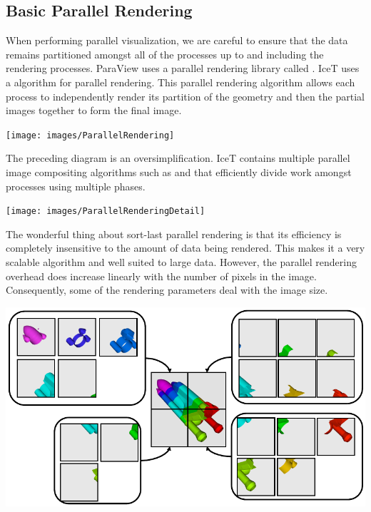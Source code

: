 \subsection{Basic Parallel Rendering}

When performing parallel visualization, we are careful to ensure that the
data remains partitioned amongst all of the processes up to and including
the rendering processes.  ParaView uses a parallel rendering library called
.  IceT uses a  algorithm for parallel
rendering.  This parallel rendering algorithm allows each process to
independently render its partition of the geometry and then
 the partial images together to form the final image.

\begin{inlinefig}
  \texttt{[image: images/ParallelRendering]}
\end{inlinefig}

The preceding diagram is an oversimplification.  IceT contains multiple
parallel image compositing algorithms such as  and
 that efficiently divide work amongst processes using
multiple phases.

\begin{inlinefig}
  \texttt{[image: images/ParallelRenderingDetail]}
\end{inlinefig}

The wonderful thing about sort-last parallel rendering is that its
efficiency is completely insensitive to the amount of data being rendered.
This makes it a very scalable algorithm and well suited to large data.
However, the parallel rendering overhead does increase linearly with the
number of pixels in the image.  Consequently, some of the rendering
parameters deal with the image size.

\begin{inlinefig}
  \includegraphics[scale=\bbscale]{images/ParallelRenderingTiles}
\end{inlinefig}


